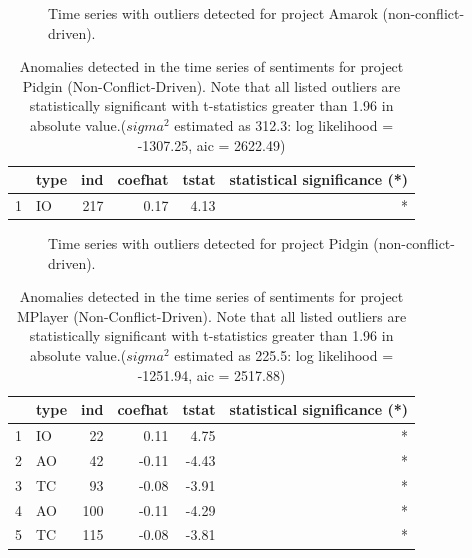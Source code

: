 \documentclass[12pt,letterpaper]{gthesis2}  %
\begin{document}
\begin{figure} [!htbp]
\centering
{}
\caption{Time series with outliers detected for project Amarok (non-conflict-driven).}
\label{figureOutliers_3}
\end{figure}

\pagebreak

\begin{table} [!htbp]
\centering
\caption{Anomalies detected in the time series of sentiments for project Pidgin (Non-Conflict-Driven). Note that all listed outliers are statistically significant with t-statistics greater than 1.96 in absolute value.($sigma^2$ estimated as 312.3:  log likelihood = -1307.25,  aic = 2622.49)}
\begin{tabular}{rlrrrr}
  \hline
 & type & ind & coefhat & tstat & statistical significance (*)\\ 
  \hline
1 & IO & 217 & 0.17 & 4.13 & * \\ 
   \hline
\end{tabular}
\end{table}

\begin{figure} [!htbp]
\centering
{}
\caption{Time series with outliers detected for project Pidgin (non-conflict-driven).}
\label{figureOutliers_5}
\end{figure}

\pagebreak

\begin{table} [!htbp]
\centering
\caption{Anomalies detected in the time series of sentiments for project MPlayer (Non-Conflict-Driven). Note that all listed outliers are statistically significant with t-statistics greater than 1.96 in absolute value.($sigma^2$ estimated as 225.5:  log likelihood = -1251.94,  aic = 2517.88)}
\begin{tabular}{rlrrrr}
  \hline
 & type & ind & coefhat & tstat & statistical significance (*)\\ 
  \hline
1 & IO &  22 & 0.11 & 4.75 & * \\ 
  2 & AO &  42 & -0.11 & -4.43 & * \\ 
  3 & TC &  93 & -0.08 & -3.91  & *\\ 
  4 & AO & 100 & -0.11 & -4.29 & * \\ 
  5 & TC & 115 & -0.08 & -3.81  & *\\ 
   \hline
\end{tabular}
\end{table}
\end{document}

